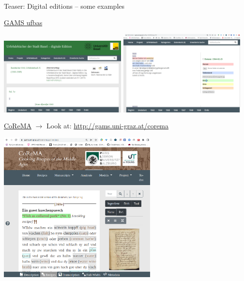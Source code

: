 

\begin{frame}[allowframebreaks]{Teaser: Digital editions -- some examples}

    \href{http://gams.uni-graz.at/o:ufbas.1563\#Eintrag-149}{GAMS ufbas}

    \includegraphics[width=0.48\textwidth]{img/ufbas1.png}
    \includegraphics[width=0.48\textwidth]{img/ufbas2.png}
    
    \framebreak
    
    \href{https://gams.uni-graz.at/o:corema.pa1.recipes}{CoReMA} $\to$
    Look at: \protect\url{http://gams.uni-graz.at/corema}
    
    \includegraphics[width=0.6\textwidth]{img/corema-b1.png}
    
    \framebreak
    

\end{frame}
